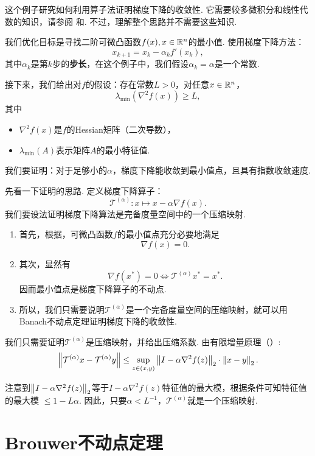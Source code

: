 \begin{example}[梯度下降的收敛性]\label{ex:gradient-descent}
这个例子研究如何利用算子法证明梯度下降的收敛性. 它需要较多微积分和线性代数的知识，请参阅 和. 不过，理解整个思路并不需要这些知识.

我们优化目标是寻找二阶可微凸函数$f(x),x\in \mathbb{R}^n$的最小值. 使用梯度下降方法：
\[x_{k+1}=x_k-\alpha_k f'(x_k),\]
其中$\alpha_k$是第$k$步的\textbf{步长}，在这个例子中，我们假设$\alpha_k=\alpha$是一个常数.


接下来，我们给出对$f$的假设：存在常数$L>0$，对任意$x\in \mathbb{R}^n$，
    \[\lambda_{\min}(\nabla^2 f(x))\geq L,\]
其中
    \begin{itemize}
        \item $\nabla^2f(x)$是$f$的Hessian矩阵（二次导数），
        \item $\lambda_{\min}(A)$表示矩阵$A$的最小特征值.
    \end{itemize}

我们要证明：对于足够小的$\alpha$，梯度下降能收敛到最小值点，且具有指数收敛速度.

先看一下证明的思路. 定义梯度下降算子：
    \[\mathcal T^{(\alpha)}: x\mapsto x - \alpha\nabla f(x).\]
我们要设法证明梯度下降算法是完备度量空间中的一个压缩映射. 
\begin{enumerate}
    \item 首先，根据，可微凸函数$f$的最小值点充分必要地满足
    \[\nabla f(x)=0.\]
    \item 其次，显然有
    \[\nabla f(x^*)=0 \iff \mathcal T^{(\alpha)}x^*=x^*.\]
    因而最小值点是梯度下降算子的不动点.
    \item 所以，我们只需要说明$\mathcal T^{(\alpha)}$是一个完备度量空间的压缩映射，就可以用Banach不动点定理证明梯度下降的收敛性.
\end{enumerate}

我们只需要证明$\mathcal T^{(\alpha)}$是压缩映射，并给出压缩系数. 由有限增量原理（）:
\[\left\|\mathcal T^{(\alpha)}x - \mathcal T^{(\alpha)}y\right\| \leq \sup_{z\in(x,y)}\left\|I - \alpha \nabla^2 f(z)\right\|_2\cdot\left\|x-y\right\|_2.\]

注意到$\left\|I-\alpha\nabla^2f(z)\right\|_2$等于$I-\alpha\nabla^2f(z)$特征值的最大模，根据条件可知特征值的最大模 $\leq 1-L\alpha$. 因此，只要$\alpha<L^{-1}$，$\mathcal T^{(\alpha)}$就是一个压缩映射.
\end{example}

\section{Brouwer不动点定理}

